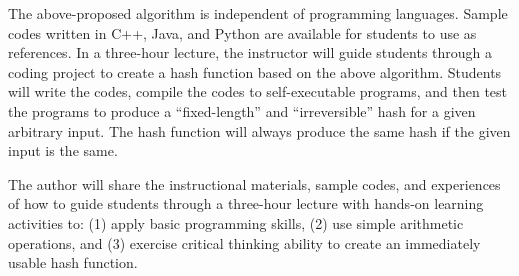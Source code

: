 \documentclass{article}
\begin{document}
The above-proposed algorithm is independent of programming languages. Sample codes written in C++, Java, and Python are available for students to use as references. In a three-hour lecture, the instructor will guide students through a coding project to create a hash function based on the above algorithm. Students will write the codes, compile the codes to self-executable programs, and then test the programs to produce a ``fixed-length'' and ``irreversible'' hash for a given arbitrary input. The hash function will always produce the same hash if the given input is the same.

The author will share the instructional materials, sample codes, and experiences of how to guide students through a three-hour lecture with hands-on learning activities to: (1) apply basic programming skills, (2) use simple arithmetic operations, and (3) exercise critical thinking ability to create an immediately usable hash function.
\end{document}
